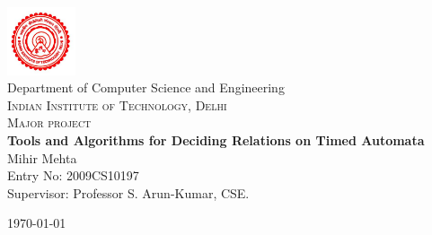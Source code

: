 \begin{titlepage}
 \begin{center}
 
 
\includegraphics[width=0.15\textwidth]{IITD-LOGO.jpg}\\[1cm]
 
{\LARGE Department of Computer Science and Engineering}\\[.5cm]
\textsc{\Large Indian Institute of Technology, Delhi}\\[1.5cm]
 
\textsc{\Large Major project}\\[0.5cm]
 
 
{ \Large \bfseries Tools and Algorithms for Deciding Relations on Timed Automata}\\[0.4cm]
 
 
{\large Mihir Mehta} \\[.5cm]
{\large Entry No: 2009CS10197} \\[.5cm]
{\large Supervisor: Professor S. Arun-Kumar, CSE.}
\vfill
 
{\large \today}
 
\end{center}

\end{titlepage}
